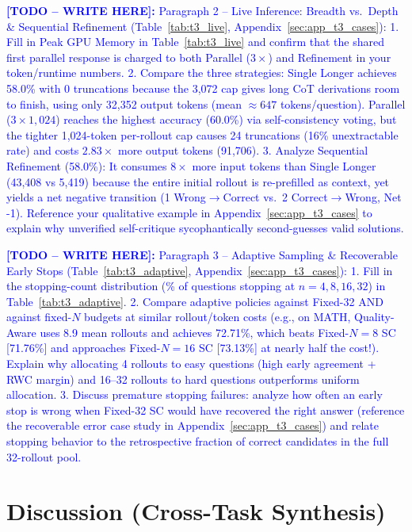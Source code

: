 \documentclass{article}
\newcommand{\writetodo}[1]{\noindent\textcolor{blue}{\textbf{[TODO -- WRITE HERE]:} #1}\par\medskip}
\begin{document}
\writetodo{Paragraph 2 -- Live Inference: Breadth vs.\ Depth & Sequential Refinement (Table~\ref{tab:t3_live}, Appendix~\ref{sec:app_t3_cases}):
1. Fill in Peak GPU Memory in Table~\ref{tab:t3_live} and confirm that the shared first parallel response is charged to both Parallel ($3\times$) and Refinement in your token/runtime numbers.
2. Compare the three strategies: Single Longer achieves 58.0\% with 0 truncations because the 3,072 cap gives long CoT derivations room to finish, using only 32,352 output tokens (mean $\approx 647$ tokens/question). Parallel ($3\times 1,024$) reaches the highest accuracy (60.0\%) via self-consistency voting, but the tighter 1,024-token per-rollout cap causes 24 truncations (16\% unextractable rate) and costs $2.83\times$ more output tokens (91,706).
3. Analyze Sequential Refinement (58.0\%): It consumes $8\times$ more input tokens than Single Longer (43,408 vs 5,419) because the entire initial rollout is re-prefilled as context, yet yields a net negative transition (1 Wrong$\rightarrow$Correct vs.\ 2 Correct$\rightarrow$Wrong, Net -1). Reference your qualitative example in Appendix~\ref{sec:app_t3_cases} to explain why unverified self-critique sycophantically second-guesses valid solutions.}

\writetodo{Paragraph 3 -- Adaptive Sampling & Recoverable Early Stops (Table~\ref{tab:t3_adaptive}, Appendix~\ref{sec:app_t3_cases}):
1. Fill in the stopping-count distribution (\% of questions stopping at $n=4, 8, 16, 32$) in Table~\ref{tab:t3_adaptive}.
2. Compare adaptive policies against Fixed-32 AND against fixed-$N$ budgets at similar rollout/token costs (e.g., on MATH, Quality-Aware uses 8.9 mean rollouts and achieves 72.71\%, which beats Fixed-$N=8$ SC [71.76\%] and approaches Fixed-$N=16$ SC [73.13\%] at nearly half the cost!). Explain why allocating 4 rollouts to easy questions (high early agreement + RWC margin) and 16--32 rollouts to hard questions outperforms uniform allocation.
3. Discuss premature stopping failures: analyze how often an early stop is wrong when Fixed-32 SC would have recovered the right answer (reference the recoverable error case study in Appendix~\ref{sec:app_t3_cases}) and relate stopping behavior to the retrospective fraction of correct candidates in the full 32-rollout pool.}

\section{Discussion (Cross-Task Synthesis)}
\label{sec:discussion}
\end{document}
